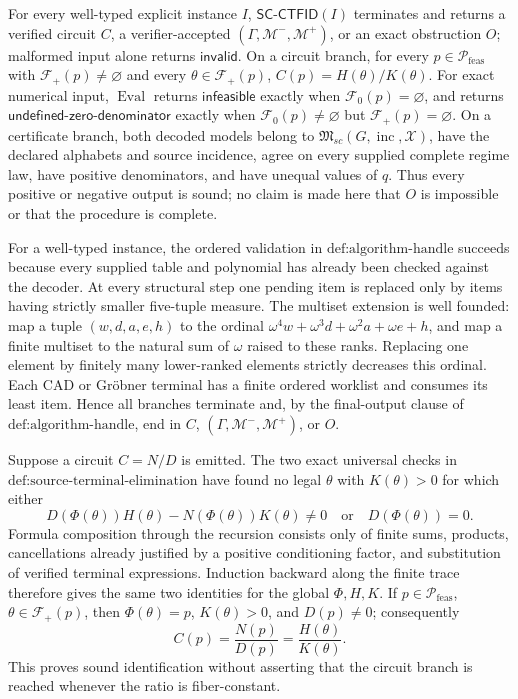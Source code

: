 For every well-typed explicit instance \(I\), \(\mathsf{SC\mbox{-}CTFID}(I)\) terminates and returns a verified circuit \(C\), a verifier-accepted \((\Gamma,\mathcal M^-,\mathcal M^+)\), or an exact obstruction \(O\); malformed input alone returns \(\mathsf{invalid}\).  On a circuit branch, for every \(p\in\mathcal P_{\mathrm{feas}}\) with \(\mathcal F_+(p)\ne\varnothing\) and every \(\theta\in\mathcal F_+(p)\), \(C(p)=H(\theta)/K(\theta)\).  For exact numerical input, \(\operatorname{Eval}\) returns \(\mathsf{infeasible}\) exactly when \(\mathcal F_0(p)=\varnothing\), and returns \(\mathsf{undefined\mbox{-}zero\mbox{-}denominator}\) exactly when \(\mathcal F_0(p)\ne\varnothing\) but \(\mathcal F_+(p)=\varnothing\).  On a certificate branch, both decoded models belong to \(\mathfrak M_{sc}(G,\operatorname{inc},\mathcal X)\), have the declared alphabets and source incidence, agree on every supplied complete regime law, have positive denominators, and have unequal values of \(q\).  Thus every positive or negative output is sound; no claim is made here that \(O\) is impossible or that the procedure is complete.

For a well-typed instance, the ordered validation in \(\text{def:algorithm-handle}\) succeeds because every supplied table and polynomial has already been checked against the decoder.  At every structural step one pending item is replaced only by items having strictly smaller five-tuple measure.  The multiset extension is well founded: map a tuple \((w,d,a,e,h)\) to the ordinal \(\omega^4w+\omega^3d+\omega^2a+\omega e+h\), and map a finite multiset to the natural sum of \(\omega\) raised to these ranks.  Replacing one element by finitely many lower-ranked elements strictly decreases this ordinal.  Each CAD or Gr\"obner terminal has a finite ordered worklist and consumes its least item.  Hence all branches terminate and, by the final-output clause of \(\text{def:algorithm-handle}\), end in \(C\), \((\Gamma,\mathcal M^-,\mathcal M^+)\), or \(O\).

Suppose a circuit \(C=N/D\) is emitted.  The two exact universal checks in \(\text{def:source-terminal-elimination}\) have found no legal \(\theta\) with \(K(\theta)>0\) for which either
\[
 D(\Phi(\theta))H(\theta)-N(\Phi(\theta))K(\theta)\ne0
 \quad\text{or}\quad D(\Phi(\theta))=0.
\]
Formula composition through the recursion consists only of finite sums, products, cancellations already justified by a positive conditioning factor, and substitution of verified terminal expressions.  Induction backward along the finite trace therefore gives the same two identities for the global \(\Phi,H,K\).  If \(p\in\mathcal P_{\mathrm{feas}}\), \(\theta\in\mathcal F_+(p)\), then \(\Phi(\theta)=p\), \(K(\theta)>0\), and \(D(p)\ne0\); consequently
\[
 C(p)=\frac{N(p)}{D(p)}=\frac{H(\theta)}{K(\theta)}.
\]
This proves sound identification without asserting that the circuit branch is reached whenever the ratio is fiber-constant.

